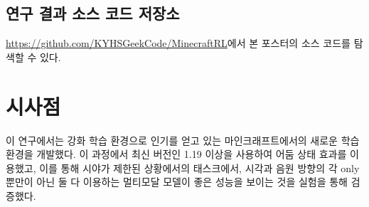 \documentclass{tudelftposter}
\begin{document}
\subsection{연구 결과 소스 코드 저장소}
\href{https://github.com/KYHSGeekCode/MinecraftRL}{https://github.com/KYHSGeekCode/MinecraftRL}에서 본 포스터의 소스 코드를 탐색할 수 있다.


\section{시사점}
이 연구에서는 강화 학습 환경으로 인기를 얻고 있는 마인크래프트에서의 새로운 학습 환경을 개발했다. 이 과정에서 최신 버전인 1.19 이상을 사용하여 어둠 상태 효과를 이용했고, 이를 통해 시야가 제한된 상황에서의 태스크에서, 시각과 음원 방향의 각 only 뿐만이 아닌 둘 다 이용하는 멀티모달 모델이 좋은 성능을 보이는 것을 실험을 통해 검증했다.

% 
\end{document}
